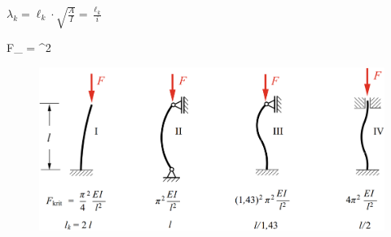 \documentclass[11pt]{article}
\newcommand{\1}{ {\mathds{1}} }
\newcommand{\scdot}{\!\cdot\!}
\begin{document}
\begin{multicols}{3}
		
		$\lambda_k = \ell_k \scdot \sqrt{\frac{A}{I}} = \frac{\ell_k}{i}$\\
		\nopagebreak
		\begin{formel}{7.19}
			F_{} = \pi^2
		\end{formel}


	\end{multicols}

	\begin{figure}[H]
		\includegraphics[width=.5\linewidth]{euler.png}
	\end{figure}
\end{document}
